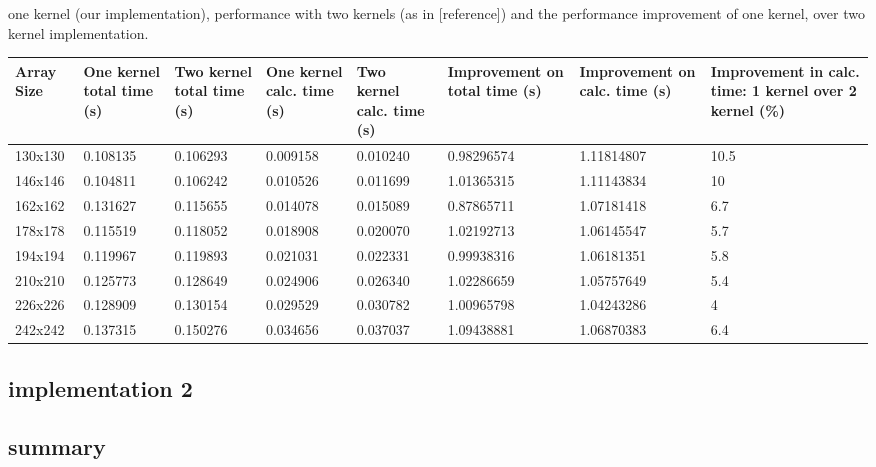 \documentclass[11pt, twocolumn]{article}
\begin{document}
    one kernel (our implementation), performance with two kernels (as in [reference]) and the performance
    improvement of one kernel, over two kernel implementation.

    \begin{center}
        \begin{tabular}{ | p{1.3cm} | p{1.5cm} | p{1.5cm} | p{1.6cm} | p{1.6cm} | p{2cm} | p{1.9cm} | p{2cm} | }
            \hline
            Array Size  & One kernel total time (s) & Two kernel total time (s) & One kernel calc. time (s) & Two kernel calc. time (s) & Improvement on total time (s) & Improvement on calc. time (s) & Improvement in calc. time: 1 kernel over 2 kernel (\%) \\ \hline
            130x130 & 0.108135    & 0.106293    & 0.009158    & 0.010240    & 0.98296574  & 1.11814807  & 10.5  \\
            146x146 & 0.104811    & 0.106242    & 0.010526    & 0.011699    & 1.01365315  & 1.11143834  & 10    \\
            162x162 & 0.131627    & 0.115655    & 0.014078    & 0.015089    & 0.87865711  & 1.07181418  & 6.7   \\
            178x178 & 0.115519    & 0.118052    & 0.018908    & 0.020070    & 1.02192713  & 1.06145547  & 5.7   \\
            194x194 & 0.119967    & 0.119893    & 0.021031    & 0.022331    & 0.99938316  & 1.06181351  & 5.8   \\
            210x210 & 0.125773    & 0.128649    & 0.024906    & 0.026340    & 1.02286659  & 1.05757649  & 5.4   \\
            226x226 & 0.128909    & 0.130154    & 0.029529    & 0.030782    & 1.00965798  & 1.04243286  & 4     \\
            242x242 & 0.137315    & 0.150276    & 0.034656    & 0.037037    & 1.09438881  & 1.06870383  & 6.4   \\
            \hline
        \end{tabular}
    \end{center}

    \subsection{implementation 2}
    \subsection{summary} %
\end{document}
